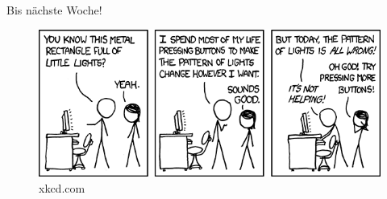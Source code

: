 \documentclass[18pt]{beamer}
\begin{document}
\begin{frame}{Bis nächste Woche!}
    \begin{figure}
        \includegraphics[scale=.5]{img/computer_problems.png}
        \caption{\footnotesize{xkcd.com}}
    \end{figure}
\end{frame}

\backupend
\end{document}
